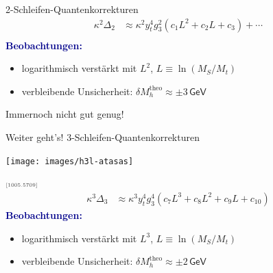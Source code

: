 \documentclass[hyperref={pdfpagelabels=false},ngerman]{beamer}
\newcommand{\eh}[1]{\,\mathsf{#1}}
\newcommand{\MS}{\ensuremath{M_S}}
\newcommand{\mycite}[1]{\ensuremath{\text{\textcolor{darkgray}{\tiny [#1]}}}}
\renewcommand{\emph}[1]{\textbf{\textcolor{darkblue}{#1}}}
\newcommand{\GeV}{\eh{GeV}}
\begin{document}
\begin{frame}{2-Schleifen-Quantenkorrekturen}
  \begin{align*}
    \kappa^2\Delta_2 &\approx
    \kappa^2 y_t^4 g_3^2 \left(
      c_1 L^2
      + c_2 L
      + c_3
    \right) + \cdots \\
  \end{align*}
  \emph{Beobachtungen:}
  \begin{itemize}
  \item logarithmisch verstärkt mit $L^2$, $L\equiv\ln(\MS / M_t)$
  \item verbleibende Unsicherheit: $\delta M_h^{\text{theo}} \approx \pm 3 \GeV$
  \end{itemize}
  \vspace*{1em}
  Immernoch nicht gut genug!
\end{frame}

\begin{frame}{Weiter geht's! 3-Schleifen-Quantenkorrekturen}
  \begin{center}
    \texttt{[image: images/h3l-atasas]}
  \end{center}
  \mycite{1005.5709}
  \begin{align*}
    \kappa^3\Delta_3 &\approx
    \kappa^3 y_t^4 g_3^4 \left(
      c_7 L^3
      + c_8 L^2
      + c_9 L
      + c_{10}
    \right)
  \end{align*}
  \emph{Beobachtungen:}
  \begin{itemize}
  \item logarithmisch verstärkt mit $L^3$, $L\equiv\ln(\MS / M_t)$
  \item verbleibende Unsicherheit: $\delta M_h^{\text{theo}} \approx \pm 2 \GeV$
  \end{itemize}
\end{frame}
\end{document}
